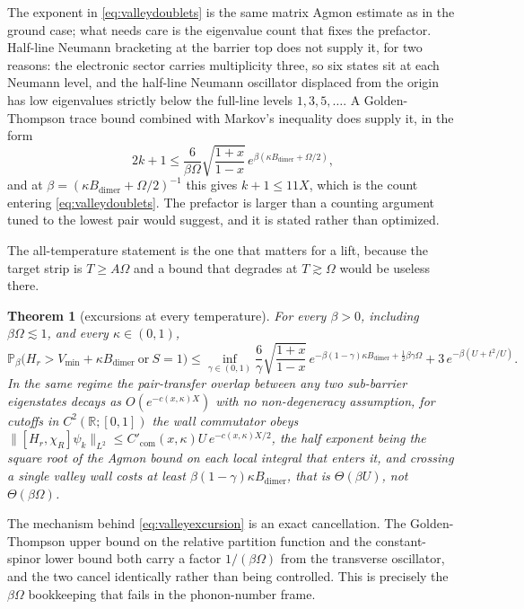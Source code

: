 \documentclass[11pt]{article}
\newtheorem{theorem}{Theorem}[section]
\theoremstyle{definition}
\theoremstyle{remark}
\begin{document}
The exponent in \eqref{eq:valleydoublets} is the same matrix Agmon estimate as in
the ground case; what needs care is the eigenvalue count that fixes the prefactor.
Half-line Neumann bracketing at the barrier top does not supply it, for two
reasons: the electronic sector carries multiplicity three, so six states sit at
each Neumann level, and the half-line Neumann oscillator displaced from the origin
has low eigenvalues strictly below the full-line levels $1,3,5,\dots$. A
Golden-Thompson trace bound combined with Markov's inequality does supply it, in
the form
\begin{equation}
2k+1\le\frac{6}{\beta\Omega}\sqrt{\frac{1+x}{1-x}}\,
e^{\beta(\kappa B_{\mathrm{dimer}}+\Omega/2)},
\label{eq:count}
\end{equation}
and at $\beta=(\kappa B_{\mathrm{dimer}}+\Omega/2)^{-1}$ this gives $k+1\le11X$,
which is the count entering \eqref{eq:valleydoublets}. The prefactor is larger
than a counting argument tuned to the lowest pair would suggest, and it is stated
rather than optimized.

The all-temperature statement is the one that matters for a lift, because the
target strip is $T\ge A\Omega$ and a bound that degrades at $T\gtrsim\Omega$ would
be useless there.

\begin{theorem}[excursions at every temperature]\label{thm:valleyexcursion}
For every $\beta>0$, including $\beta\Omega\lesssim1$, and every
$\kappa\in(0,1)$,
\begin{equation}
\mathbb{P}_{\beta}\bigl(H_{r}>V_{\min}+\kappa B_{\mathrm{dimer}}\ \text{or}\
S=1\bigr)
\le\inf_{\gamma\in(0,1)}\frac{6}{\gamma}\sqrt{\frac{1+x}{1-x}}\,
e^{-\beta(1-\gamma)\kappa B_{\mathrm{dimer}}+\frac12\beta\gamma\Omega}
+3\,e^{-\beta(U+t^{2}/U)} .
\label{eq:valleyexcursion}
\end{equation}
In the same regime the pair-transfer overlap between any two sub-barrier
eigenstates decays as $O(e^{-c(x,\kappa)X})$ with no non-degeneracy assumption,
for cutoffs in $C^{2}(\mathbb{R};[0,1])$ the wall commutator obeys
$\|[H_{r},\chi_{R}]\psi_{k}\|_{L^{2}}\le C'_{\mathrm{com}}(x,\kappa)U\,
e^{-c(x,\kappa)X/2}$, the half exponent being the square root of the Agmon bound
on each local integral that enters it,
and crossing a single valley wall costs at least
$\beta(1-\gamma)\kappa B_{\mathrm{dimer}}$, that is $\Theta(\beta U)$, not
$\Theta(\beta\Omega)$.
\end{theorem}

The mechanism behind \eqref{eq:valleyexcursion} is an exact cancellation. The
Golden-Thompson upper bound on the relative partition function and the
constant-spinor lower bound both carry a factor $1/(\beta\Omega)$ from the
transverse oscillator, and the two cancel identically rather than being
controlled. This is precisely the $\beta\Omega$ bookkeeping that fails in the
phonon-number frame.
\end{document}

